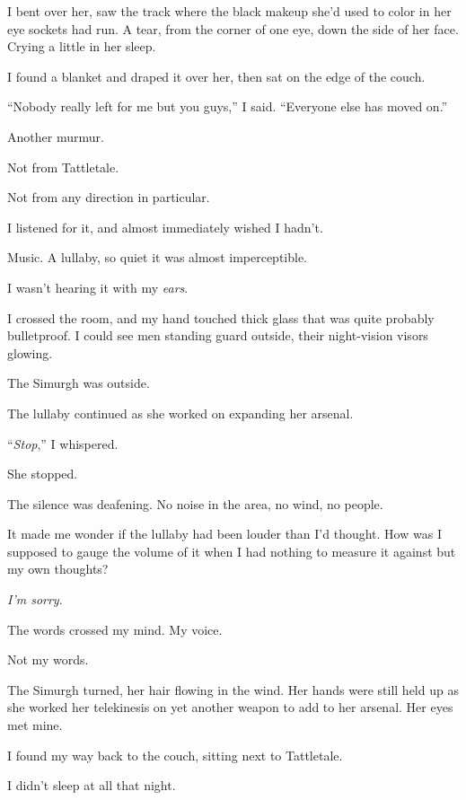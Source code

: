 I bent over her, saw the track where the black makeup she'd used to color in her eye sockets had run.  A tear, from the corner of one eye, down the side of her face.  Crying a little in her sleep.



I found a blanket and draped it over her, then sat on the edge of the couch.



``Nobody really left for me but you guys,'' I said.  ``Everyone else has moved on.''



Another murmur.



Not from Tattletale.



Not from any direction in particular.



I listened for it, and almost immediately wished I hadn't.



Music.  A lullaby, so quiet it was almost imperceptible.



I wasn't hearing it with my \emph{ears}.



I crossed the room, and my hand touched thick glass that was quite probably bulletproof.  I could see men standing guard outside, their night-vision visors glowing.



The Simurgh was outside.



The lullaby continued as she worked on expanding her arsenal.



``\emph{Stop},'' I whispered.



She stopped.



The silence was deafening.  No noise in the area, no wind, no people.



It made me wonder if the lullaby had been louder than I'd thought.  How was I supposed to gauge the volume of it when I had nothing to measure it against but my own thoughts?



\emph{I'm sorry}.



The words crossed my mind.  My voice.



Not my words.



The Simurgh turned, her hair flowing in the wind.  Her hands were still held up as she worked her telekinesis on yet another weapon to add to her arsenal.  Her eyes met mine.



I found my way back to the couch, sitting next to Tattletale.



I didn't sleep at all that night.





